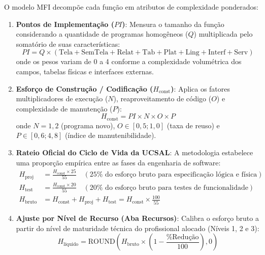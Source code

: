 O modelo MFI decompõe cada função em atributos de complexidade ponderados:
\begin{enumerate}[leftmargin=*]
    \item \textbf{Pontos de Implementação ($PI$)}: Mensura o tamanho da função considerando a quantidade de programas homogêneos ($Q$) multiplicada pelo somatório de suas características:
    \begin{equation}
        PI = Q \times \left( \text{Tela} + \text{SemTela} + \text{Relat} + \text{Tab} + \text{Plat} + \text{Ling} + \text{Interf} + \text{Serv} \right)
    \end{equation}
    onde os pesos variam de 0 a 4 conforme a complexidade volumétrica dos campos, tabelas físicas e interfaces externas.
    
    \item \textbf{Esforço de Construção / Codificação ($H_{\text{const}}$)}: Aplica os fatores multiplicadores de execução ($N$), reaproveitamento de código ($O$) e complexidade de manutenção ($P$):
    \begin{equation}
        H_{\text{const}} = PI \times N \times O \times P
    \end{equation}
    onde $N = 1{,}2$ (programa novo), $O \in [0{,}5; 1{,}0]$ (taxa de reuso) e $P \in [0{,}6; 4{,}8]$ (índice de manutenibilidade).

    \item \textbf{Rateio Oficial do Ciclo de Vida da UCSAL}: A metodologia estabelece uma proporção empírica entre as fases da engenharia de software:
    \begin{align}
        H_{\text{proj}} &= \frac{H_{\text{const}} \times 25}{55} \quad (25\% \text{ do esforço bruto para especificação lógica e física}) \\
        H_{\text{test}} &= \frac{H_{\text{const}} \times 20}{55} \quad (20\% \text{ do esforço bruto para testes de funcionalidade}) \\
        H_{\text{bruto}} &= H_{\text{const}} + H_{\text{proj}} + H_{\text{test}} = H_{\text{const}} \times \frac{100}{55}
    \end{align}

    \item \textbf{Ajuste por Nível de Recurso (Aba Recursos)}: Calibra o esforço bruto a partir do nível de maturidade técnica do profissional alocado (Níveis 1, 2 e 3):
    \begin{equation}
        H_{\text{líquido}} = \text{ROUND}\left( H_{\text{bruto}} \times \left(1 - \frac{\% \text{Redução}}{100}\right), 0 \right)
    \end{equation}
\end{enumerate}

